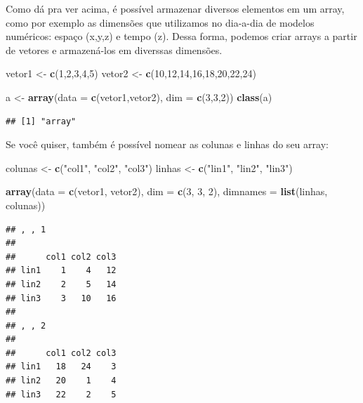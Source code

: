 \documentclass[]{book}
\newenvironment{Shaded}{\begin{snugshade}}{\end{snugshade}}
\newcommand{\KeywordTok}[1]{\textcolor[rgb]{0.13,0.29,0.53}{\textbf{#1}}}
\newcommand{\DataTypeTok}[1]{\textcolor[rgb]{0.13,0.29,0.53}{#1}}
\newcommand{\DecValTok}[1]{\textcolor[rgb]{0.00,0.00,0.81}{#1}}
\newcommand{\StringTok}[1]{\textcolor[rgb]{0.31,0.60,0.02}{#1}}
\newcommand{\NormalTok}[1]{#1}
\theoremstyle{definition}
\theoremstyle{definition}
\theoremstyle{definition}
\theoremstyle{remark}
\begin{document}
Como dá pra ver acima, é possível armazenar diversos elementos em um
array, como por exemplo as dimensões que utilizamos no dia-a-dia de
modelos numéricos: espaço (x,y,z) e tempo (z). Dessa forma, podemos
criar arrays a partir de vetores e armazená-los em diverssas dimensões.

\begin{Shaded}
\begin{Highlighting}[]
\NormalTok{vetor1 <-}\StringTok{ }\KeywordTok{c}\NormalTok{(}\DecValTok{1}\NormalTok{,}\DecValTok{2}\NormalTok{,}\DecValTok{3}\NormalTok{,}\DecValTok{4}\NormalTok{,}\DecValTok{5}\NormalTok{)}
\NormalTok{vetor2 <-}\StringTok{ }\KeywordTok{c}\NormalTok{(}\DecValTok{10}\NormalTok{,}\DecValTok{12}\NormalTok{,}\DecValTok{14}\NormalTok{,}\DecValTok{16}\NormalTok{,}\DecValTok{18}\NormalTok{,}\DecValTok{20}\NormalTok{,}\DecValTok{22}\NormalTok{,}\DecValTok{24}\NormalTok{)}

\NormalTok{a <-}\StringTok{ }\KeywordTok{array}\NormalTok{(}\DataTypeTok{data =} \KeywordTok{c}\NormalTok{(vetor1,vetor2), }\DataTypeTok{dim =} \KeywordTok{c}\NormalTok{(}\DecValTok{3}\NormalTok{,}\DecValTok{3}\NormalTok{,}\DecValTok{2}\NormalTok{))}
\KeywordTok{class}\NormalTok{(a)}
\end{Highlighting}
\end{Shaded}

\begin{verbatim}
## [1] "array"
\end{verbatim}

Se você quiser, também é possível nomear as colunas e linhas do seu
array:

\begin{Shaded}
\begin{Highlighting}[]
\NormalTok{colunas <-}\StringTok{ }\KeywordTok{c}\NormalTok{(}\StringTok{"col1"}\NormalTok{, }\StringTok{"col2"}\NormalTok{, }\StringTok{"col3"}\NormalTok{)}
\NormalTok{linhas <-}\StringTok{ }\KeywordTok{c}\NormalTok{(}\StringTok{"lin1"}\NormalTok{, }\StringTok{"lin2"}\NormalTok{, }\StringTok{"lin3"}\NormalTok{)}

\KeywordTok{array}\NormalTok{(}\DataTypeTok{data =} \KeywordTok{c}\NormalTok{(vetor1, vetor2), }\DataTypeTok{dim =} \KeywordTok{c}\NormalTok{(}\DecValTok{3}\NormalTok{, }\DecValTok{3}\NormalTok{, }\DecValTok{2}\NormalTok{), }\DataTypeTok{dimnames =} \KeywordTok{list}\NormalTok{(linhas, colunas))}
\end{Highlighting}
\end{Shaded}

\begin{verbatim}
## , , 1
## 
##      col1 col2 col3
## lin1    1    4   12
## lin2    2    5   14
## lin3    3   10   16
## 
## , , 2
## 
##      col1 col2 col3
## lin1   18   24    3
## lin2   20    1    4
## lin3   22    2    5
\end{verbatim}
\end{document}
